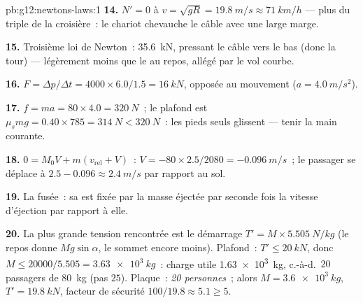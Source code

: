 \begin{solution}{pb:g12:newtons-laws:1}
\textbf{14.} $N' = 0$ à $v = \sqrt{gR} = \qty{19.8}{m/s} \approx
\qty{71}{km/h}$ --- plus du triple de la croisière~: le chariot
chevauche le câble avec une large marge.

\textbf{15.} Troisième loi de Newton~: \qty{35.6}{kN}, pressant le
câble vers le bas (donc la tour) --- légèrement moins que le
 au repos, allégé par le vol courbe.

\textbf{16.} $F = \Delta p/\Delta t = 4000 \times 6.0/1.5 =
\qty{16}{kN}$, opposée au mouvement ($a = \qty{4.0}{m/s^2}$).

\textbf{17.} $f = ma = 80 \times 4.0 = \qty{320}{N}$~; le plafond est
$\mu_s mg = 0.40 \times 785 = \qty{314}{N} < \qty{320}{N}$~: les
pieds seuls glissent --- tenir la main courante.

\textbf{18.} $0 = M_0 V + m(v_{\text{rel}} + V)$~:
$V = -80 \times 2.5/2080 = \qty{-0.096}{m/s}$~; le passager se déplace
à $2.5 - 0.096 \approx \qty{2.4}{m/s}$ par rapport au sol.

\textbf{19.} La fusée~: sa  est fixée par la masse éjectée par
seconde fois la vitesse d'éjection par rapport à elle.

\textbf{20.} La plus grande tension rencontrée est le démarrage
$T' = M \times \qty{5.505}{N/kg}$ (le repos donne $Mg\sin\alpha$, le
sommet encore moins). Plafond~: $T' \leq \qty{20}{kN}$, donc
$M \leq 20000/5.505 = \qty{3.63e3}{kg}$~: charge utile
\qty{1.63e3}{kg}, c.-à-d.\ $20$ passagers de \qty{80}{kg} (pas $25$).
Plaque~: \emph{20 personnes}~; alors $M = \qty{3.6e3}{kg}$,
$T' = \qty{19.8}{kN}$, facteur de sécurité $100/19.8 \approx 5.1 \geq 5$.
\end{solution}
